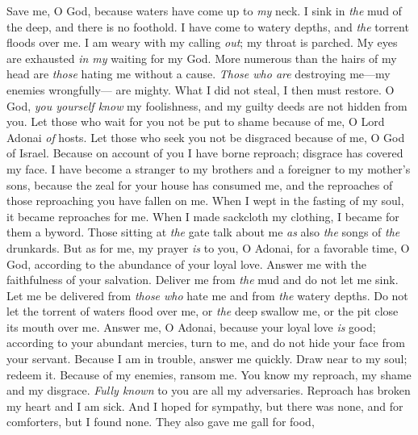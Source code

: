 \begin{biblechapter} %
 Save me, O God, 
because waters have come up to \textit{my} neck.
\verse I sink in \textit{the} mud of the deep, and there is no foothold. 
I have come to watery depths, 
and \textit{the} torrent floods over me.
\verse I am weary with my calling \textit{out}; my throat is parched. 
My eyes are exhausted \textit{in my} waiting for my God.
\verse More numerous than the hairs of my head 
are \textit{those} hating me without a cause. 
\textit{Those who are} destroying me—my enemies wrongfully— are mighty. 
What I did not steal, I then must restore.
\verse O God, \textit{you yourself know} my foolishness, 
and my guilty deeds are not hidden from you.
\verse Let those who wait for you not be put to shame because of me, 
O Lord Adonai \textit{of} hosts. 
Let those who seek you not be disgraced because of me, 
O God of Israel.
\verse Because on account of you I have borne reproach; 
disgrace has covered my face.
\verse I have become a stranger to my brothers 
and a foreigner to my mother’s sons,
\verse because the zeal for your house has consumed me, 
and the reproaches of those reproaching you have fallen on me.
\verse When I wept in the fasting of my soul, 
it became reproaches for me.
\verse When I made sackcloth my clothing, 
I became for them a byword.
\verse Those sitting at \textit{the} gate talk about me 
\textit{as} also \textit{the} songs of \textit{the} drunkards.
\verse But as for me, my prayer \textit{is} to you, O Adonai, for a favorable time, 
O God, according to the abundance of your loyal love. 
Answer me with the faithfulness of your salvation.
\verse Deliver me from \textit{the} mud and do not let me sink. 
Let me be delivered from \textit{those who} hate me 
and from \textit{the} watery depths.
\verse Do not let the torrent of waters flood over me, 
or \textit{the} deep swallow me, 
or the pit close its mouth over me.
\verse Answer me, O Adonai, because your loyal love \textit{is} good; 
according to your abundant mercies, turn to me,
\verse and do not hide your face from your servant. 
Because I am in trouble, answer me quickly.
\verse Draw near to my soul; redeem it. 
Because of my enemies, ransom me.
\verse You know my reproach, my shame and my disgrace. 
\textit{Fully known} to you are all my adversaries.
\verse Reproach has broken my heart and I am sick. 
And I hoped for sympathy, but there was none, 
and for comforters, but I found none.
\verse They also gave me gall for food, 

\end{biblechapter}
